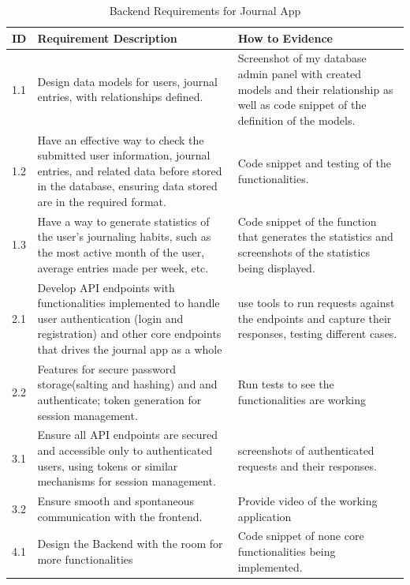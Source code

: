 \begin{table}[H]
\centering
\begin{tabular}{|l|p{8cm}|p{4cm}|}  
\hline
\textbf{ID} & \textbf{Requirement Description}& \textbf{How to Evidence} \\ \hline
1.1 & Design data models for users, journal entries, with relationships defined. & Screenshot of my database admin panel with created models and their relationship as well as code snippet of the definition of the models. \\ \hline

1.2 & Have an effective way to check the submitted user information, journal entries, and related data before stored in the database, ensuring data stored are in the required format. & Code snippet and testing of the functionalities. \\ \hline

1.3 & Have a way to generate statistics of the user's journaling habits, such as the most active month of the user, average entries made per week, etc. & Code snippet of the function that generates the statistics and screenshots of the statistics being displayed. \\ \hline

2.1 & Develop API endpoints with functionalities implemented to handle user authentication (login and registration) and other core endpoints that drives the journal app as a whole & use tools to run requests against the endpoints and capture their responses, testing different cases.\\ \hline

2.2 & Features for secure password storage(salting and hashing) and and authenticate; token generation for session management.& Run tests to see the functionalities are working\\ \hline

3.1 & Ensure all API endpoints are secured and accessible only to authenticated users, using tokens or similar mechanisms for session management.& screenshots of authenticated requests and their responses. \\ \hline

3.2 & Ensure smooth and spontaneous communication with the frontend. & Provide video of the working application \\ \hline
4.1 & Design the Backend with the room for more functionalities & Code snippet of none core functionalities being implemented. \\ \hline

\end{tabular}
\caption{Backend Requirements for Journal App}
\end{table}

